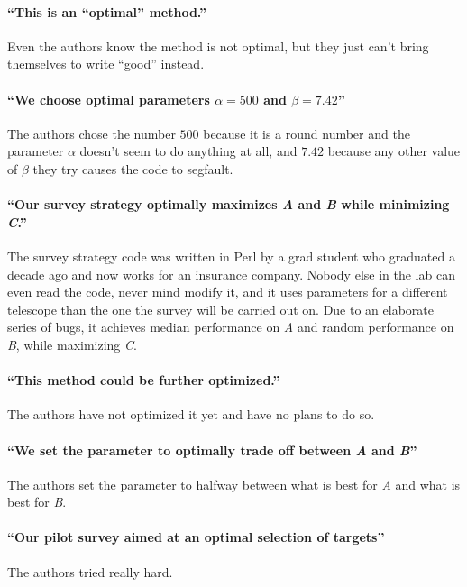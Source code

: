 \documentclass[12pt, preprint]{aastex}
\begin{document}
\paragraph{``This is an ``optimal'' method.''}
Even the authors know the method is not optimal, but they just can't bring
themselves to write ``good'' instead.

\paragraph{``We choose optimal parameters $\alpha=500$ and $\beta=7.42$''}
The authors chose the number $500$ because it is a round number and
the parameter $\alpha$ doesn't seem to do anything at all, and $7.42$
because any other value of $\beta$ they try causes the code to
segfault.

\paragraph{``Our survey strategy optimally maximizes \emph{A} and \emph{B} while minimizing \emph{C}.''}
The survey strategy code was written in Perl by a grad student who
graduated a decade ago and now works for an insurance company.  Nobody
else in the lab can even read the code, never mind modify it, and it
uses parameters for a different telescope than the one the survey will
be carried out on.  Due to an elaborate series of bugs, it achieves
median performance on \emph{A} and random performance on \emph{B},
while maximizing \emph{C}.


\paragraph{``This method could be further optimized.''}
The authors have not optimized it yet and have no plans to do so.

\paragraph{``We set the parameter to optimally trade off between \emph{A} and \emph{B}''}
The authors set the parameter to halfway between what is best for
\emph{A} and what is best for \emph{B}.

\paragraph{``Our pilot survey aimed at an optimal selection of targets''}
The authors tried really hard.
\end{document}
